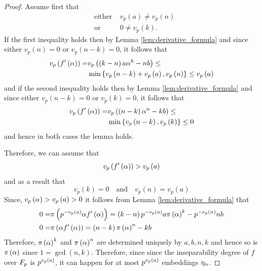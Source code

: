 \documentclass[../main.tex]{subfiles}
\begin{document}
\begin{proof}
  Assume first that
  \begin{align*}
    & \text{either } & 
    v_p\left( a \right) \neq
    v_p\left( n \right) \\
    & \text{or } &
    0 \neq
    v_p\left( k \right).
  \end{align*} 
  If the first inequality holds then by Lemma \ref{lem:derivative_formula} and since either $v_p\left( n \right) = 0$ or $v_p\left( n - k \right) = 0$, it follows that 
  \begin{align*}
    v_p\left( f'\left( \alpha \right) \right) = 
    & v_p\left( \left( k - n \right)a\alpha^k - nb \right) \leq
    \\
    & \min\left\{ 
      v_p\left( n - k \right) + v_p\left( a \right), 
      v_p\left( n \right)
    \right\} \leq v_p\left( a \right) 
  \end{align*}
  and if the second inequality holds then by Lemma \ref{lem:derivative_formula} and since either $v_p\left( n - k \right) = 0$ or $v_p\left( k \right) = 0$, it follows that
  \begin{align*}
    v_p\left( f'\left( \alpha \right) \right) = 
    & v_p\left( \left( n - k \right)\alpha^n - kb \right) \leq
    \\
    & \min\left\{ 
      v_p\left( n - k \right), 
      v_p\left( k \right)
    \right\} \leq 0 
  \end{align*}
  and hence in both cases the lemma holds.

  Therefore, we can assume that
  \begin{equation}
    v_p\left( f'\left( \alpha \right) \right) > v_p\left( a \right)
  \end{equation} 
  and as a result that
  \begin{equation}
    \label{eq:valuation_equality}
    v_p\left( k \right) = 0 \quad \text{and} \quad v_p\left( n \right) = v_p\left( a \right)
  \end{equation}
  Since, $v_p\left( \alpha \right) > v_p\left( a \right) > 0$ it follows from Lemma \ref{lem:derivative_formula} that
  \begin{align*}
    0 = & \pi\left( p^{-v_p\left( a \right)} \alpha f'\left( \alpha \right) \right) = 
    \left( k- n \right)p^{-v_p\left( a \right)} a \pi\left( \alpha \right)^k - p^{-v_p\left( n \right)}nb \\
    0 = & \pi\left( \alpha f'\left( \alpha \right) \right) =
    \left( n - k \right)\pi\left( \alpha \right)^n - kb
  \end{align*}
  Therefore, $\pi\left( \alpha \right)^k$ and $\pi\left( \alpha \right)^n$ are determined uniquely by $a,b,n,k$ and hence so is $\pi\left( \alpha \right)$ since $1 = \gcd\left( n, k \right)$.
  Therefore, since since the inseparability degree of $f$ over $F_p$ is $p^{v_p\left( a \right)}$, it can happen for at most $p^{v_p\left( a \right)}$ embeddings $\eta_\alpha$. 


\end{proof}
\end{document}
